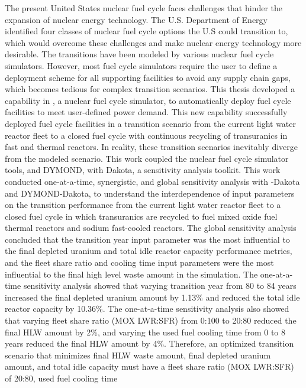 The present United States nuclear fuel cycle faces challenges that hinder 
the expansion of nuclear energy technology. 
The U.S. Department of Energy identified four classes of nuclear fuel cycle 
options the U.S could transition to, which would overcome these challenges 
and make nuclear energy technology more desirable. 
The transitions have been modeled by various nuclear fuel cycle simulators. 
However, most fuel cycle simulators require the user to define a deployment 
scheme for all supporting facilities to avoid any supply chain gaps, which becomes 
tedious for complex transition scenarios.
This thesis developed a capability in \Cyclus, a nuclear fuel cycle simulator, 
to automatically deploy fuel cycle 
facilities to meet user-defined power demand. 
This new capability successfully deployed fuel cycle facilities
in a transition scenario from the current 
light water reactor fleet to a closed fuel cycle with continuous recycling of transuranics in fast and 
thermal reactors.
In reality, these transition scenarios inevitably diverge from the 
modeled scenario. 
This work coupled the nuclear fuel cycle simulator tools, \Cyclus and DYMOND, 
with Dakota, a sensitivity analysis toolkit. 
This work conducted one-at-a-time, synergistic, and 
global sensitivity analysis with \Cyclus-Dakota and DYMOND-Dakota,
to understand the interdependence of input parameters on the  
transition performance from the current 
light water reactor fleet to a closed fuel cycle in which transuranics are recycled to fuel 
mixed oxide fuel thermal reactors and sodium fast-cooled reactors. 
The global sensitivity analysis concluded that 
the transition year input parameter was the most influential
to the final depleted uranium and total idle reactor capacity 
performance metrics, and  
the fleet share ratio and cooling time input parameters 
were the most influential to the final high level waste amount in the 
simulation. 
The one-at-a-time sensitivity analysis showed that varying transition 
year from 80 to 84 years increased the final depleted uranium amount by 
1.13\% and reduced the total idle reactor capacity by 10.36\%. 
The one-at-a-time sensitivity analysis also showed that varying 
fleet share ratio (MOX LWR:SFR) from 0:100 to 20:80 reduced the 
final HLW amount by 2\%, and varying the used fuel cooling time from 0 to 
8 years reduced the final HLW amount by 4\%. 
Therefore, an optimized transition scenario that minimizes final 
HLW waste amount, final depleted uranium amount, and total idle capacity 
must have a fleet share ratio (MOX LWR:SFR) of 20:80, used fuel cooling time 
